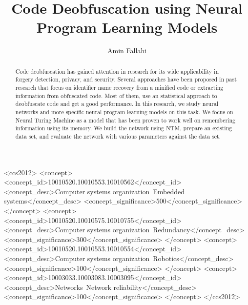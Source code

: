 \documentclass[acmsmall]{acmart}
\begin{document}
\title{Code Deobfuscation using Neural Program Learning Models}

\author{Amin Fallahi}

\renewcommand{\shortauthors}{Fallahi, et al.}

\begin{abstract}
	Code deobfuscation has gained attention in research for its wide applicability in forgery detection, privacy, and security. Several approaches have been proposed in past research that focus on identifier name recovery from a minified code or extracting information from obfuscated code. Most of them, use an statistical approach to deobfuscate code and get a good performance. In this research, we study neural networks and more specific neural program learning models on this task. We focus on Neural Turing Machine as a model that has been proven to work well on remembering information using its memory. We build the network using NTM, prepare an existing data set, and evaluate the network with various parameters against the data set.
\end{abstract}

\begin{CCSXML}
<ccs2012>
 <concept>
  <concept_id>10010520.10010553.10010562</concept_id>
  <concept_desc>Computer systems organization~Embedded systems</concept_desc>
  <concept_significance>500</concept_significance>
 </concept>
 <concept>
  <concept_id>10010520.10010575.10010755</concept_id>
  <concept_desc>Computer systems organization~Redundancy</concept_desc>
  <concept_significance>300</concept_significance>
 </concept>
 <concept>
  <concept_id>10010520.10010553.10010554</concept_id>
  <concept_desc>Computer systems organization~Robotics</concept_desc>
  <concept_significance>100</concept_significance>
 </concept>
 <concept>
  <concept_id>10003033.10003083.10003095</concept_id>
  <concept_desc>Networks~Network reliability</concept_desc>
  <concept_significance>100</concept_significance>
 </concept>
</ccs2012>
\end{CCSXML}
\end{document}
